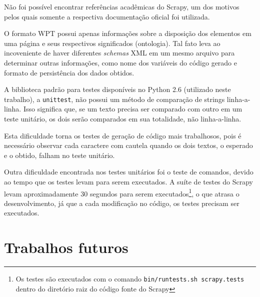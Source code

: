 Não foi possível encontrar referências acadêmicas do Scrapy, um dos motivos pelos quais somente a respectiva documentação oficial foi utilizada.

O formato WPT possui apenas informações sobre a disposição dos elementos em uma página e seus respectivos significados (ontologia). Tal fato leva ao incoveniente de haver diferentes \emph{schemas} XML em um mesmo arquivo para determinar outras informações, como nome dos variáveis do código gerado e formato de persistência dos dados obtidos.

A biblioteca padrão para testes disponíveis no Python 2.6 (utilizado neste trabalho), a \texttt{unittest}, não possui um método de comparação de strings linha-a-linha. Isso significa que, se um texto precisa ser comparado com outro em um teste unitário, os dois serão comparados em sua totalidade, não linha-a-linha. 

Esta dificuldade torna os testes de geração de código mais trabalhosos, pois é necessário observar cada caractere com cautela quando os dois textos, o esperado e o obtido, falham no teste unitário.

Outra dificuldade encontrada nos testes unitários foi o teste de comandos, devido ao tempo que os testes levam para serem executados. A suíte de testes do Scrapy levam aproximadamente 30 segundos para serem executados\footnote{Os testes são executados com o comando \texttt{bin/runtests.sh scrapy.tests} dentro do diretório raiz do código fonte do Scrapy }, o que atrasa o desenvolvimento, já que a cada modificação no código, os testes precisam ser executados.

\pagebreak
\section{Trabalhos futuros}